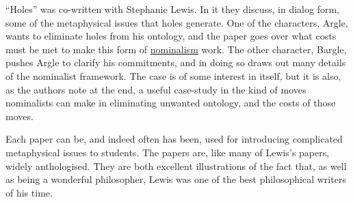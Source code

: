 ``Holes'' \citep{Lewis1970Lewis} was co-written with Stephanie Lewis. In it they discuss, in dialog form, some of the metaphysical issues that holes generate. One of the characters, Argle, wants to eliminate holes from his ontology, and the paper goes over what costs must be met to make this form of \href{http://plato.stanford.edu/nominalism-metaphysics/}{nominalism} work. The other character, Bargle, pushes Argle to clarify his commitments, and in doing so draws out many details of the nominalist framework. The case is of some interest in itself, but it is also, as the authors note at the end, a useful case-study in the kind of moves nominalists can make in eliminating unwanted ontology, and the costs of those moves.

Each paper can be, and indeed often has been, used for introducing complicated metaphysical issues to students. The papers are, like many of Lewis's papers, widely anthologised. They are both excellent illustrations of the fact that, as well as being a wonderful philosopher, Lewis was one of the best philosophical writers of his time.

